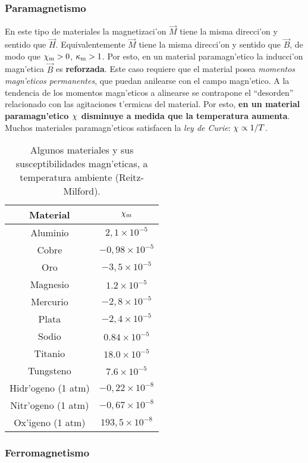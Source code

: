 \subsubsection{Paramagnetismo}
 En este tipo de materiales la magnetizaci'on $\vec{M}$
tiene la misma direcci'on y sentido que $\vec{H}$. Equivalentemente $\vec{M}$
tiene la misma direcci'on y sentido que $\vec{B}$, de modo que
$\chi_{\rm m}>0$, $\kappa_{\rm m}>1$. Por esto, en un material paramagn'etico la inducci'on magn'etica $\vec{B}$ es \textbf{reforzada}. Este caso requiere que el material posea \textit{momentos magn'eticos permanentes}, que puedan anilearse con el campo magn'etico.
A la tendencia de los momentos magn'eticos a alinearse se
contrapone el ``desorden'' relacionado con las agitaciones t'ermicas del
material. Por esto, \textbf{en un material paramagn'etico $\chi_{\rm}$ disminuye a
medida que la temperatura aumenta}. Muchos materiales paramagn'eticos satisfacen
la \textit{ley de Curie}: $\chi_{\rm}\propto 1/T$.
\begin{table}[h!]
\begin{center}
\begin{tabular}{c|c}
Material & $\chi_{\rm m}$ \\ \hline\hline
Aluminio & $2,1\times 10^{-5}$ \\
Cobre & $-0,98\times 10^{-5}$ \\
Oro & $-3,5\times 10^{-5}$ \\
Magnesio & $1.2\times 10^{-5}$ \\
Mercurio & $-2,8\times 10^{-5}$ \\
Plata & $-2,4\times 10^{-5}$ \\
Sodio & $0.84\times 10^{-5}$ \\
Titanio & $18.0\times 10^{-5}$ \\
Tungsteno & $7.6\times 10^{-5}$ \\
Hidr'ogeno (1 atm) & $-0,22\times 10^{-8}$ \\
Nitr'ogeno (1 atm) & $-0,67\times 10^{-8}$ \\
Ox'igeno (1 atm) & $193,5\times 10^{-8}$
\end{tabular}
\caption{Algunos materiales y sus susceptibilidades magn'eticas, a temperatura ambiente (Reitz-Milford).}
\end{center}
\end{table}

\subsubsection{Ferromagnetismo}

